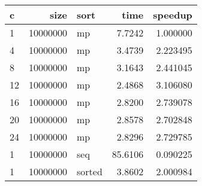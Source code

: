 \begin{tabular}{lrlrr}
\toprule
 c &     size &   sort &    time &  speedup \\
\midrule
 1 & 10000000 &     mp &  7.7242 & 1.000000 \\
 4 & 10000000 &     mp &  3.4739 & 2.223495 \\
 8 & 10000000 &     mp &  3.1643 & 2.441045 \\
12 & 10000000 &     mp &  2.4868 & 3.106080 \\
16 & 10000000 &     mp &  2.8200 & 2.739078 \\
20 & 10000000 &     mp &  2.8578 & 2.702848 \\
24 & 10000000 &     mp &  2.8296 & 2.729785 \\
 1 & 10000000 &    seq & 85.6106 & 0.090225 \\
 1 & 10000000 & sorted &  3.8602 & 2.000984 \\
\bottomrule
\end{tabular}
